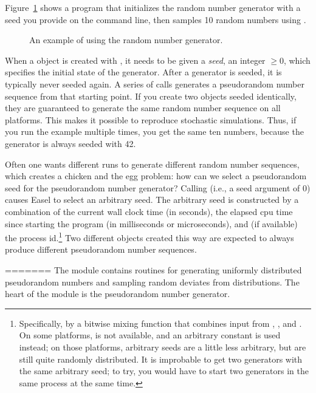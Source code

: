 Figure~\ref{fig:random_example} shows a program that initializes the
random number generator with a seed you provide on the command line,
then samples 10 random numbers using .

\begin{figure}

\caption{An example of using the random number generator.}
\label{fig:random_example}
\end{figure}

When a  object is created with
, it needs to be given a \emph{seed},
an integer $\geq 0$, which specifies the initial state of the
generator. After a generator is seeded, it is typically never seeded
again. A series of  calls generates a
pseudorandom number sequence from that starting point. If you create
two  objects seeded identically, they are
guaranteed to generate the same random number sequence on all
platforms. This makes it possible to reproduce stochastic simulations.
Thus, if you run the example multiple times, you get the same ten
numbers, because the generator is always seeded with 42.

Often one wants different runs to generate different random number
sequences, which creates a chicken and the egg problem: how can we
select a pseudorandom seed for the pseudorandom number generator?
Calling  (i.e., a seed argument of
0) causes Easel to select an arbitrary seed. The arbitrary seed is
constructed by a combination of the current wall clock time (in
seconds), the elapsed cpu time since starting the program (in
milliseconds or microseconds), and (if available) the process
id.\footnote{Specifically, by a bitwise mixing function that combines
  input from , , and . On
  some platforms,  is not available, and an arbitrary
  constant is used instead; on those platforms, arbitrary seeds are a
  little less arbitrary, but are still quite randomly distributed.  It
  is improbable to get two generators with the same arbitrary seed; to
  try, you would have to start two generators in the same process at
  the same time.} Two different  objects
created this way are expected to always produce different pseudorandom
number sequences.


=======
The  module contains routines for generating uniformly
distributed pseudorandom numbers and sampling random deviates from
distributions. The heart of the module is the 
pseudorandom number generator.

